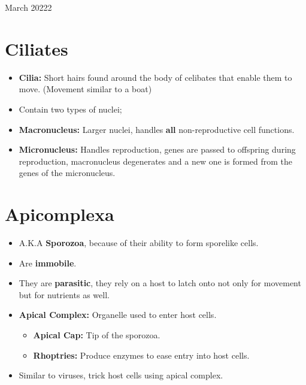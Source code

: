 \documentclass[12pt,oneside]{book} %
\begin{document}
\begin{lec}{March 20222}
  \section*{Ciliates}

  \begin{itemize}
    \item \textbf{Cilia:} Short hairs found around the body of celibates that enable them to move.
       (Movement similar to a boat)
    \item Contain two types of nuclei;
    \item \textbf{Macronucleus:} Larger nuclei, handles \textbf{all} non-reproductive cell functions.
    \item \textbf{Micronucleus:} Handles reproduction, genes are passed to offspring during reproduction, macronucleus
       degenerates and a new one is formed from the genes of the micronucleus.
  \end{itemize}

  \section*{Apicomplexa}

  \begin{itemize}
    \item A.K.A \textbf{Sporozoa}, because of their ability to form sporelike cells.
    \item Are \textbf{immobile}.
    \item They are \textbf{parasitic}, they rely on a host to latch onto not only for movement but for nutrients as well.
    \item \textbf{Apical Complex:} Organelle used to enter host cells.
    \begin{itemize}
      \item \textbf{Apical Cap:} Tip of the sporozoa.
      \item \textbf{Rhoptries:} Produce enzymes to ease entry into host cells.
    \end{itemize}
    \item Similar to viruses, trick host cells using apical complex.
  \end{itemize}


  







  








\end{lec}
\end{document}
